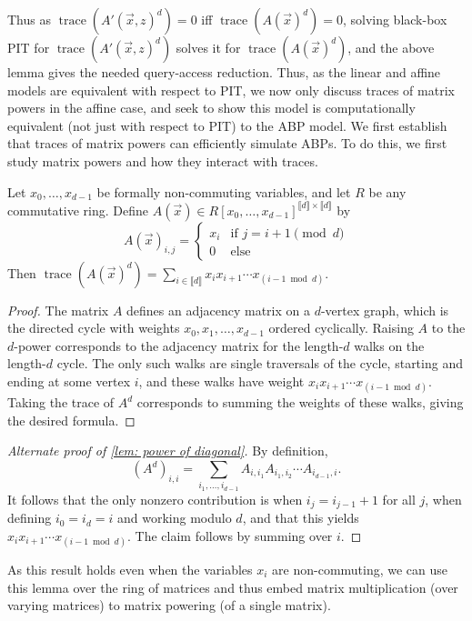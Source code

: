 \documentclass[letterpaper,11pt]{article}
\numberwithin{equation}{section}
\theoremstyle{plain}
\theoremstyle{remark}
\newcommand{\zr}[1]{{\llbracket {#1}\rrbracket}}
\DeclareMathOperator{\tr}{trace}
\DeclareMathOperator{\Tr}{trace}
\begin{document}
Thus as $\tr(A'(\vec{x},z)^d)=0$ iff $\tr(A(\vec{x})^d)=0$, solving black-box PIT for $\tr(A'(\vec{x},z)^d)$ solves it for $\tr(A(\vec{x})^d)$, and the above lemma gives the needed query-access reduction. Thus, as the linear and affine models are equivalent with respect to PIT, we now only discuss traces of matrix powers in the affine case, and seek to show this model is computationally equivalent (not just with respect to PIT) to the ABP model. We first establish that traces of matrix powers can efficiently simulate ABPs.  To do this, we first study matrix powers and how they interact with traces.

\begin{lemma}\label{lem: power of diagonal}
	Let $x_0,\ldots,x_{d-1}$ be formally non-commuting variables, and let $R$ be any commutative ring.  Define $A(\vec{x})\in R[x_0,\ldots,x_{d-1}]^{\zr{d}\times\zr{d}}$ by
	\[A(\vec{x})_{i,j}=
		\begin{cases}
			x_i	&\text{if } j=i+1\pmod{d}\\
			0	&\text{else}
		\end{cases}
	\]
	Then $\Tr(A(\vec{x})^d)=\sum_{i\in\zr{d}}x_ix_{i+1}\cdots x_{(i-1 \bmod{d})}$.
\end{lemma}
\begin{proof}
	The matrix $A$ defines an adjacency matrix on a $d$-vertex graph, which is the directed cycle with weights $x_0,x_1,\ldots,x_{d-1}$ ordered cyclically. Raising $A$ to the $d$-power corresponds to the adjacency matrix for the length-$d$ walks on the length-$d$ cycle.  The only such walks are single traversals of the cycle, starting and ending at some vertex $i$, and these walks have weight $x_ix_{i+1}\cdots x_{(i-1\bmod{d})}$.  Taking the trace of $A^d$ corresponds to summing the weights of these walks, giving the desired formula.
\end{proof}
\begin{proof}[Alternate proof of \autoref{lem: power of diagonal}]
	By definition, \[(A^d)_{i,i}= \sum_{i_1,\ldots,i_{d-1}}A_{i,i_1} A_{i_1,i_2}\cdots A_{i_{d-1},i}.\] It follows that the only nonzero contribution is when $i_j=i_{j-1}+1$ for all $j$, when defining $i_0=i_d=i$ and working modulo $d$, and that this yields $x_ix_{i+1}\cdots x_{(i-1\bmod{d})}$. The claim follows by summing over $i$.
\end{proof}

As this result holds even when the variables $x_i$ are non-commuting, we can use this lemma over the ring of matrices and thus embed matrix multiplication (over varying matrices) to matrix powering (of a single matrix).
\end{document}
